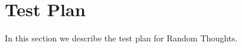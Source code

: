 
\chapter{Test Plan}
\label{chapt:test-plan}

In this section we describe the test plan for Random Thoughts.
